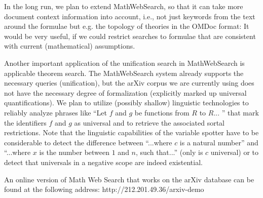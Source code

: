 \documentclass{deliverablereport}
\begin{document}
In the long run, we plan to extend MathWebSearch, so that it can take more document context information into account, i.e., not just keywords from the text around the formulae but e.g. the topology of theories in the OMDoc format: It would be very useful, if we could restrict searches to formulae that are consistent with current (mathematical) assumptions. \par

Another important application of the unification search in MathWebSearch is applicable theorem search. The MathWebSearch system already supports the necessary queries (unification), but the arXiv corpus we are currently using does not have the necessary degree of formalization (explicitly marked up universal quantifications). We plan to utilize (possibly shallow) linguistic technologies to reliably analyze phrases like “Let $f$ and $g$ be functions from $R$ to $R$... ” that mark the identifiers $f$ and $g$ as universal and to retrieve the associated sortal restrictions. Note that the linguistic capabilities of the variable spotter have to be considerable to detect the difference between “...where $c$ is a natural number” and “...where $x$ is the number between $1$ and $n$, such that...” (only is $c$ universal) or to detect that universals in a negative scope are indeed existential. \par

An online version of Math Web Search that works on the arXiv database can be found at the following address: http://212.201.49.36/arxiv-demo \par
\end{document}
